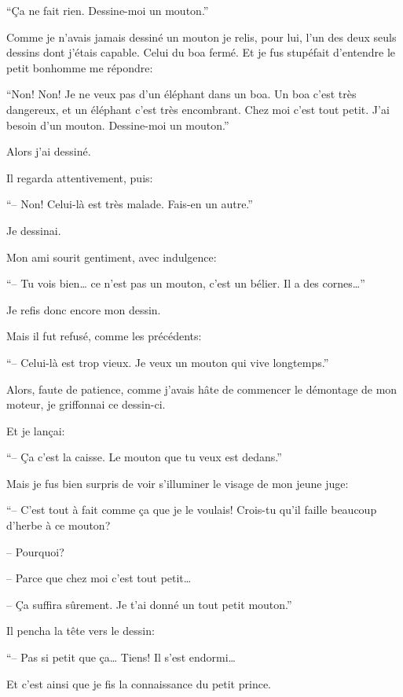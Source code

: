 \begin{Parallel}[p]{}{}
{``Ça ne fait rien. Dessine-moi un mouton.''

Comme je n'avais jamais dessiné un mouton je relis, pour lui, l'un des deux seuls dessins dont j'étais capable. Celui du boa fermé. Et je fus stupéfait d'entendre le
petit bonhomme me répondre:

``Non! Non! Je ne veux pas d'un
éléphant dans un boa. Un boa c'est
très dangereux, et un éléphant c'est très encombrant. Chez moi c'est tout petit. J'ai besoin d’un
mouton. Dessine-moi un mouton.''

Alors j'ai dessiné.

Il regarda attentivement, puis:

``-- Non! Celui-là est très
malade. Fais-en un autre.''

Je dessinai.

Mon ami sourit gentiment, avec
indulgence:

``-- Tu vois bien\ldots{} ce n'est pas un mouton, c'est un
bélier. Il a des cornes\ldots{}''

Je refis donc encore mon dessin.

Mais il fut refusé, comme les précédents:

``-- Celui-là est trop vieux. Je veux un
mouton qui vive longtemps.''

Alors, faute de patience, comme
j'avais hâte de commencer le démontage de mon moteur, je griffonnai ce
dessin-ci.

Et je lançai:

``-- Ça c'est la caisse. Le mouton que tu
veux est dedans.''

Mais je fus bien surpris de voir s'illuminer le
visage de mon jeune juge:

``-- C'est tout à fait comme ça que je le voulais!
Crois-tu qu'il faille beaucoup d'herbe à ce mouton?

-- Pourquoi?

-- Parce que chez moi c'est tout petit\ldots{}

-- Ça suffira sûrement. Je t'ai donné un tout
petit mouton.''

Il pencha la tête vers le dessin:

``-- Pas si petit que ça\ldots{} Tiens! Il s'est endormi\ldots{}

Et c'est ainsi que je fis la connaissance du petit
prince.
}


\end{Parallel}
